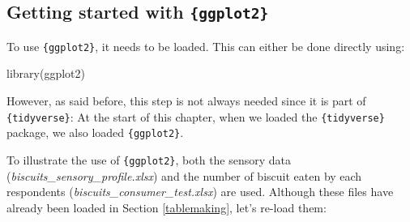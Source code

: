 \documentclass[
]{krantz}
\makeatletter
\newenvironment{Shaded}{\begin{snugshade}}{\end{snugshade}}
\newcommand{\FunctionTok}[1]{\textcolor[rgb]{0,0,0}{#1}}
\newcommand{\NormalTok}[1]{#1}
\newenvironment{kframe}{%
\medskip{}
\setlength{\fboxsep}{.8em}
 \def\at@end@of@kframe{}%
 \ifinner\ifhmode%
  \def\at@end@of@kframe{\end{minipage}}%
  \begin{minipage}{\columnwidth}%
 \fi\fi%
 \def\FrameCommand##1{\hskip\@totalleftmargin \hskip-\fboxsep
 \colorbox{shadecolor}{##1}\hskip-\fboxsep
     \hskip-\linewidth \hskip-\@totalleftmargin \hskip\columnwidth}%
 \MakeFramed {\advance\hsize-\width
   \@totalleftmargin\z@ \linewidth\hsize
   \@setminipage}}%
 {\par\unskip\endMakeFramed%
 \at@end@of@kframe}
\renewenvironment{Shaded}{\begin{kframe}}{\end{kframe}}
\makeatother
\begin{document}
\hypertarget{ggplot2}{%
\subsection{\texorpdfstring{Getting started with \texttt{\{ggplot2\}}}{Getting started with \{ggplot2\}}}\label{ggplot2}}

To use \texttt{\{ggplot2\}}, it needs to be loaded. This can either be done directly using:

\begin{Shaded}
\begin{Highlighting}[]
\FunctionTok{library}\NormalTok{(ggplot2)}
\end{Highlighting}
\end{Shaded}

However, as said before, this step is not always needed since it is part of \texttt{\{tidyverse\}}: At the start of this chapter, when we loaded the \texttt{\{tidyverse\}} package, we also loaded \texttt{\{ggplot2\}}.

To illustrate the use of \texttt{\{ggplot2\}}, both the sensory data (\emph{biscuits\_sensory\_profile.xlsx}) and the number of biscuit eaten by each respondents (\emph{biscuits\_consumer\_test.xlsx}) are used. Although these files have already been loaded in Section \ref{tablemaking}, let's re-load them:
\end{document}
